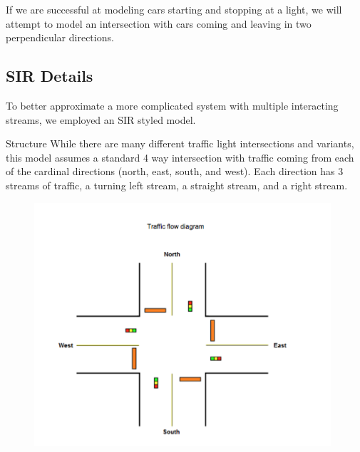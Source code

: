 \documentclass[12pt]{article}
\begin{document}
If we are successful at modeling cars starting and stopping at a light, we will attempt to model an intersection with cars coming and leaving in two perpendicular directions.


\subsection{SIR Details}
To better approximate a more complicated system with multiple interacting streams, we employed an SIR styled model. 

Structure
While there are many different traffic light intersections and variants, this model assumes a standard 4 way intersection with traffic coming from each of the cardinal directions (north, east, south, and west). Each direction has 3 streams of traffic, a turning left stream, a straight stream, and a right stream. 

\begin{figure}[htp]
    \centering
    \includegraphics[width=11cm]{figures/TrafficDiagrampng.png}
    \label{fig:diagram}
\end{figure}
\end{document}
